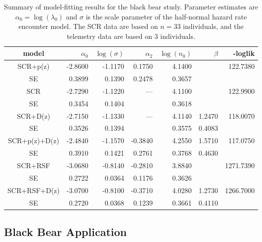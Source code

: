 \begin{table}
\centering
\caption{
Summary of model-fitting results for the black bear study. Parameter
estimates are $\alpha_{0} = \log(\lambda_{0})$ and $\sigma$ is the
scale parameter of the half-normal hazard rate encounter model.
The SCR data are based on $n=33$ individuals, and the telemetry data
are based on 3 individuals.
}
\begin{tabular}{c|rrrrrr}
\hline \hline
model & $\alpha_0$ & $\log(\sigma)$ & $\alpha_{2}$ & $\log(n_{0})$ &
$\beta$ & -loglik \\ \hline
SCR+p(z)     & -2.8600  & -1.1170  &  0.1750 &  4.1400   &        &122.7380  \\
   SE        &  0.3899 &  0.1390 &  0.2478&  0.3657  &        & \\
 SCR         & -2.7290  &  -1.1220 &  ---&  4.1100   &        &              122.9900   \\
   SE        &  0.3454 &   0.1404&        &  0.3618  &        &       \\
SCR+D(z)     & -2.7150  & -1.1330  &  ---  &  4.1140   & 1.2470  &   118.0070  \\
   SE        &  0.3526 & 0.1394  &        &  0.3575  & 0.4083 &       \\
SCR+p(z)+D(z)& -2.4840  & -1.1570  &-0.3840  &  4.2550   & 1.5710  &      117.0750 \\
   SE        &  0.3910 &  0.1421 & 0.2761 &  0.3768  & 0.4630 & \\
SCR+RSF     &   -3.0680  & -0.8140  &-0.2810  &  3.8840   &        &   1271.7390 \\
   SE       &    0.2722 &  0.0364 & 0.1176 &  0.3626  &        & \\
SCR+RSF+D(z)&  -3.0700  &-0.8100   &-0.3710  &  4.0280   & 1.2730  &   1266.7000 \\
   SE       &   0.2720 &  0.0368  & 0.1239 &  0.3661  & 0.4110 &    \\
\hline
\end{tabular}
\label{tab.nyresults}
\end{table}








\subsection{Black Bear Application}

